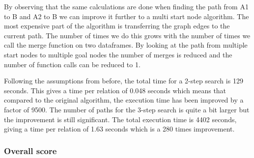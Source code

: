 By observing that the same calculations are done when finding the path from A1 to B and A2 to B we can improve it further to a multi start node algorithm. The most expensive part of the algorithm is transferring the graph edges to the current path. The number of times we do this grows with the number of times we call the merge function on two dataframes. By looking at the path from multiple start nodes to multiple goal nodes the number of merges is reduced and the number of function calls can be reduced to 1. 

Following the assumptions from before, the total time for a 2-step search is 129 seconds. This gives a time per relation of 0.048 seconds which means that compared to the original algorithm, the execution time has been improved by a factor of 9500. The number of paths for the 3-step search is quite a bit larger but the improvement is still significant. The total execution time is 4402 seconds, giving a time per relation of 1.63 seconds which is a 280 times improvement. 

\subsubsection{Overall score}

